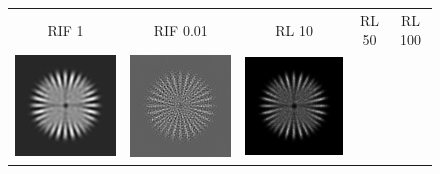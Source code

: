 \documentclass{./packages/optica-article}
\begin{document}
\begin{figure}
	\begin{tabular}{c c | c c c}
		RIF 1                                                                               &
		RIF 0.01                                                                            &
		RL 10                                                                               &
		RL 50                                                                               &
		RL 100
		\\
		\includegraphics[scale=0.25]{Simulation deconvolution/ref_np_0.01/RIF_1}            &
		\includegraphics[scale=0.25]{Simulation deconvolution/ref_np_0.01/RIF_0.01}         &
		\includegraphics[scale=0.25]{Simulation deconvolution/ref_np_0.01/RL_10}            &

\end{tabular}
\end{figure}
\end{document}
